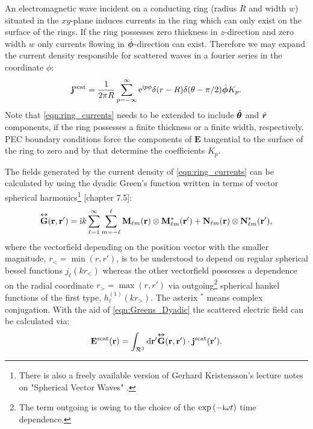 An electromagnetic wave incident on a conducting ring (radius $R$ and width $w$) situated in the $xy$-plane induces currents in the ring which can only exist on the surface of the rings. If the ring possesses zero thickness in $z$-direction and zero width $w$ only currents flowing in $\hat{\bm{\phi}}$-direction can exist. Therefore we may expand the current density responsible for scattered waves in a fourier series in the coordinate $\phi$:
\begin{equation}
\mathbf{j}^\text{scat} = \frac{1}{2\pi R}\sum_{p=-\infty}^\infty \mathrm{e}^{\mathrm{i} p \phi} \delta(r-R) \delta(\theta-\pi/2) \hat{\bm{\phi}}K_p.
\label{eqn:ring_currents}
\end{equation}
Note that \cref{eqn:ring_currents} needs to be extended to include $\hat{\bm{\theta}}$ and $\hat{\bm{r}}$ components, if the ring possesses a finite thickness or a finite width, respectively. PEC boundary conditions force the components of $\mathbf{E}$ tangential to the surface of the ring to zero and by that determine the coefficients $K_p$.

The fields generated by the current density of \cref{eqn:ring_currents} can be
calculated by using the dyadic Green's function written in terms of vector spherical harmonics\footnote{There is also a freely available version of Gerhard Kristensson's lecture notes on "Spherical Vector Waves" \citep{Kristensson2014}.} \Cite{Kristensson2016}[chapter 7.5]:
\begin{equation}
\overset{\bm\leftrightarrow}{\mathbf{G}}(\mathbf{r},\mathbf{r}') = \mathrm{i} k \sum_{\ell=1}^\infty \sum_{m=-\ell}^\ell
\mathbf{M}_{\ell m}(\mathbf{r})\otimes\mathbf{M}_{\ell m}^*(\mathbf{r}')+
\mathbf{N}_{\ell m}(\mathbf{r})\otimes\mathbf{N}_{\ell m}^*(\mathbf{r}'),
\label{eqn:Greens_Dyadic}
\end{equation}
where the vectorfield depending on the position vector with the smaller magnitude, $r_<=\min\left(r, r'\right)$, is to be understood to depend on regular spherical bessel functions $j_\ell(kr_<)$ whereas the other vectorfield possesses a dependence on the radial coordinate $r_>=\max\left(r, r'\right)$ via outgoing\footnote{The term outgoing is owing to the choice of the $\exp\left(-\mathrm{i}\omega t\right)$ time dependence.} spherical hankel functions of the first type, $h_\ell^{(1)}(kr_>)$.
The asterix $^*$ means complex conjugation. With the aid of \cref{eqn:Greens_Dyadic} the scattered electric field can be calculated via:
\begin{equation}
\mathbf{E}^\text{scat}(\mathbf{r}) = \int_{\mathcal{R}^3}  \mathrm{d} \mathbf{r}' 
\overset{\bm\leftrightarrow}{\mathbf{G}}(\mathbf{r},\mathbf{r}') \cdot \mathbf{j}^\text{scat}(\mathbf{r}').
\label{eqn:E_scattered}
\end{equation}

